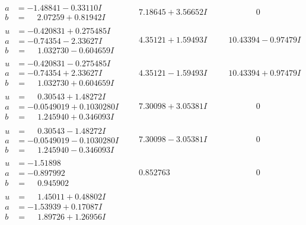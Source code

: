 \documentclass[1p]{elsarticle_modified}
\theoremstyle{definition}
\begin{document}
$$\begin{array}{c|c|c}
\begin{aligned}
a &= -1.48841 - 0.33110 I \\
b &= \phantom{-}2.07259 + 0.81942 I\end{aligned}
 & \phantom{-}7.18645 + 3.56652 I & \phantom{-0.000000 } 0 \\ \hline\begin{aligned}
u &= -0.420831 + 0.275485 I \\
a &= -0.74354 - 2.33627 I \\
b &= \phantom{-}1.032730 - 0.604659 I\end{aligned}
 & \phantom{-}4.35121 + 1.59493 I & \phantom{-}10.43394 - 0.97479 I \\ \hline\begin{aligned}
u &= -0.420831 - 0.275485 I \\
a &= -0.74354 + 2.33627 I \\
b &= \phantom{-}1.032730 + 0.604659 I\end{aligned}
 & \phantom{-}4.35121 - 1.59493 I & \phantom{-}10.43394 + 0.97479 I \\ \hline\begin{aligned}
u &= \phantom{-}0.30543 + 1.48272 I \\
a &= -0.0549019 + 0.1030280 I \\
b &= \phantom{-}1.245940 + 0.346093 I\end{aligned}
 & \phantom{-}7.30098 + 3.05381 I & \phantom{-0.000000 } 0 \\ \hline\begin{aligned}
u &= \phantom{-}0.30543 - 1.48272 I \\
a &= -0.0549019 - 0.1030280 I \\
b &= \phantom{-}1.245940 - 0.346093 I\end{aligned}
 & \phantom{-}7.30098 - 3.05381 I & \phantom{-0.000000 } 0 \\ \hline\begin{aligned}
u &= -1.51898\phantom{ +0.000000I} \\
a &= -0.897992\phantom{ +0.000000I} \\
b &= \phantom{-}0.945902\phantom{ +0.000000I}\end{aligned}
 & \phantom{-}0.852763\phantom{ +0.000000I} & \phantom{-0.000000 } 0 \\ \hline\begin{aligned}
u &= \phantom{-}1.45011 + 0.48802 I \\
a &= -1.53939 + 0.17087 I \\
b &= \phantom{-}1.89726 + 1.26956 I\end{aligned}

\end{array}$$
\end{document}
